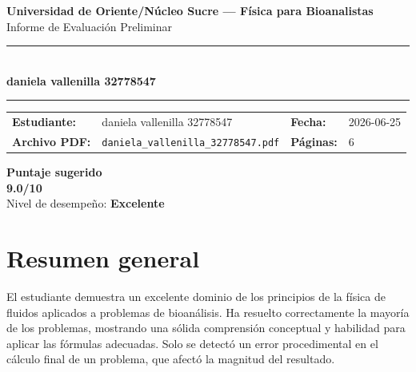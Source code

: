 \documentclass[11pt,a4paper]{article}
\begin{document}
\begin{center}
  {\Large\bfseries\color{azulTitulo} Universidad de Oriente/Núcleo Sucre --- Física para Bioanalistas}\\[4pt]
  {\large Informe de Evaluación Preliminar}\\[12pt]
  \rule{\linewidth}{1.2pt}\\[6pt]
  {\LARGE\bfseries daniela vallenilla 32778547}\\[4pt]
  \rule{\linewidth}{0.6pt}
\end{center}

\vspace{4pt}
\begin{tcolorbox}[cajaTitulo, title=Datos del informe]
\begin{tabular}{@{}llll@{}}
  \textbf{Estudiante:}  & daniela vallenilla 32778547  &
  \textbf{Fecha:}       & 2026-06-25 \\[4pt]
  \textbf{Archivo PDF:} & \texttt{daniela\_vallenilla\_32778547.pdf}  &
  \textbf{Páginas:}     & 6 \\
\end{tabular}
\end{tcolorbox}

\vspace{6pt}
\begin{center}
  \begin{tcolorbox}[
    enhanced,
    colback=white, colframe=desempeno_excelente,
    width=0.62\linewidth,
    boxrule=2pt,
    halign=center, valign=center,
    top=8pt, bottom=8pt,
  ]
    \centering
    {\large\bfseries Puntaje sugerido}\\[6pt]
    {\Huge\bfseries\color{desempeno_excelente} 9.0/10}\\[6pt]
    {\large Nivel de desempeño: \textbf{\color{desempeno_excelente} Excelente}}
  \end{tcolorbox}
\end{center}

\section*{Resumen general}
El estudiante demuestra un excelente dominio de los principios de la física de fluidos aplicados a problemas de bioanálisis. Ha resuelto correctamente la mayoría de los problemas, mostrando una sólida comprensión conceptual y habilidad para aplicar las fórmulas adecuadas. Solo se detectó un error procedimental en el cálculo final de un problema, que afectó la magnitud del resultado.
\end{document}
